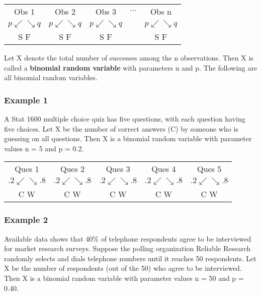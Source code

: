 \documentclass[11pt]{book}\usepackage[]{graphicx}\usepackage[]{color}
\begin{document}
\begin{center}
\begin{tabular}{@{} ccccc @{}} \hline
Obs 1 & Obs 2 & Obs 3 & $\cdots$ & Obs n \\
$p \swarrow  \searrow q$ & $p \swarrow  \searrow q$ & $p \swarrow  \searrow q$ & & $p \swarrow  \searrow q$ \\
S \hspace{3mm}   F & S  \hspace{3mm}  F &  S  \hspace{3mm}  F &  & S \hspace{3mm}   F \\ \hline
\end{tabular}
\end{center}

Let X denote the total number of successes among the n observations.  Then
X is called a \textbf{binomial random variable}  with parameters n and p. The following are all binomial random variables.

\subsubsection{Example 1} A Stat 1600 multiple choice quiz has five questions, with each question having five choices.  Let X be the number of correct answers (C) by someone who is guessing on all questions.  Then X is a binomial random variable with parameter values n = 5 and p = 0.2.

\begin{center}
\begin{tabular}{@{} ccccc @{}} \hline
Ques 1 & Ques 2 & Ques 3 & Ques 4 & Ques 5 \\
$.2 \swarrow  \searrow .8$ & $.2 \swarrow  \searrow .8$ & $.2 \swarrow  \searrow .8$ & $.2 \swarrow  \searrow .8$ & $.2 \swarrow  \searrow .8$ \\
C \hspace{3mm} W & C  \hspace{3mm}  W &  C  \hspace{3mm}  W &   C \hspace{3mm} W & C \hspace{3mm}   W \\ \hline
\end{tabular}
\end{center}

\subsubsection{Example 2} Available data shows that 40\% of telephone respondents agree to be interviewed for market research surveys.  Suppose the polling organization Reliable Research randomly selects and dials telephone numbers until it reaches 50 respondents.  Let X be the number of respondents (out of the 50) who agree to be interviewed.  Then X is a binomial random variable with parameter values n = 50 and p = 0.40.
\end{document}
